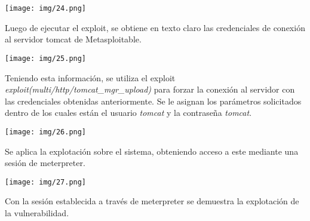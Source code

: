 \documentclass[12pt,oneside,a4paper]{book}
\begin{document}
\begin{enumerate}
\vspace{1em}

\begin{center}
    \texttt{[image: img/24.png]}
\end{center}

\vspace{1em}

\hspace{20pt}
Luego de ejecutar el exploit, se obtiene en texto claro las credenciales de conexión al servidor tomcat de Metasploitable.

\vspace{1em}

\begin{center}
    \texttt{[image: img/25.png]}
\end{center}

\vspace{1em}

\hspace{20pt}
Teniendo esta información, se utiliza el exploit  \textit{exploit(multi/http/tomcat\_mgr\_upload)} para forzar la conexión al servidor con las credenciales obtenidas anteriormente. Se le asignan los parámetros solicitados dentro de los cuales están el usuario \textit{tomcat} y la contraseña \textit{tomcat}.

\vspace{1em}

\begin{center}
    \texttt{[image: img/26.png]}
\end{center}

\vspace{1em}

\hspace{20pt}
Se aplica la explotación sobre el sistema, obteniendo acceso a este mediante una sesión de meterpreter.

\vspace{1em}

\begin{center}
    \texttt{[image: img/27.png]}
\end{center}

\vspace{1em}

\hspace{20pt}
Con la sesión establecida a través de meterpreter se demuestra la explotación de la vulnerabilidad.

\vspace{2em}


\end{enumerate}
\end{document}
